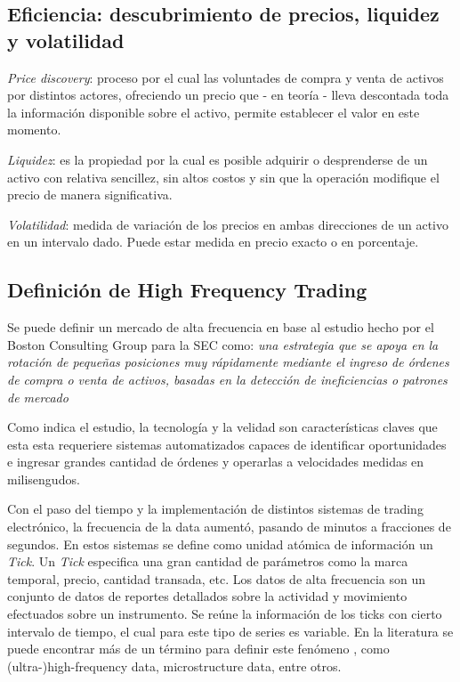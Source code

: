 \subsection{Eficiencia: descubrimiento de precios, liquidez y volatilidad}

\emph{Price discovery}: proceso por el cual las voluntades de compra y venta de
activos por distintos actores, ofreciendo un precio que - en teoría - lleva
descontada toda la información disponible sobre el activo, permite establecer
el valor en este momento.

\emph{Liquidez}: es la propiedad por la cual es posible adquirir o desprenderse
de un activo con relativa sencillez, sin altos costos y sin que la operación
modifique el precio de manera significativa.

\emph{Volatilidad}: medida de variación de los precios en ambas direcciones de
un activo en un intervalo dado. Puede estar medida en precio exacto o en
porcentaje.


\subsection{Definición de High Frequency Trading}

Se puede definir un mercado de alta frecuencia en base al estudio hecho por el
Boston Consulting Group para la SEC como: \emph{una estrategia que se apoya
en la rotación de pequeñas posiciones muy rápidamente mediante el ingreso de
órdenes de compra o venta de activos, basadas en la detección de ineficiencias
o patrones de mercado}%

Como indica el estudio, la tecnología y la velidad son características claves
que esta esta requeriere sistemas automatizados capaces de identificar
oportunidades e ingresar grandes cantidad de órdenes y operarlas a velocidades
medidas en milisengudos.

Con el paso del tiempo y la implementación de distintos sistemas de trading
electrónico, la frecuencia de la data aumentó, pasando de minutos a fracciones
de segundos.  En estos sistemas se define como unidad atómica de información un
\emph{Tick}. Un \emph{Tick} especifica una gran cantidad de parámetros como la
marca temporal, precio, cantidad transada, etc.  Los datos de alta frecuencia
son un conjunto de datos de reportes detallados sobre la actividad y movimiento
efectuados sobre un instrumento. Se reúne la información de los ticks con
cierto intervalo de tiempo, el cual para este tipo de series es variable. En la
literatura se puede encontrar más de un término para definir este fenómeno
\cite{ei2007quantitative}, como (ultra-)high-frequency data, microstructure
data, entre otros.


